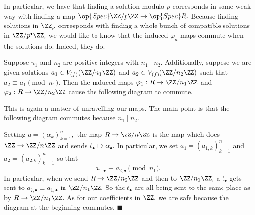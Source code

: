 In particular, we have that finding a solution modulo $p$ corresponds in some weak way with finding a map $\op{Spec}\ZZ/p\ZZ\to\op{Spec}R.$ Because finding solutions in $\ZZ_p$ corresponds with finding a whole bunch of compatible solutions in $\ZZ/p^\bullet\ZZ,$ we would like to know that the induced $\varphi_a$ maps commute when the solutions do. Indeed, they do.
\begin{lemma}
    Suppose $n_1$ and $n_2$ are positive integers with $n_1\mid n_2.$ Additionally, suppose we are given solutions $a_1\in V_{(f)}(\ZZ/n_1\ZZ)$ and $a_2\in V_{(f)}(\ZZ/n_2\ZZ)$ such that $a_2\equiv a_1\pmod{n_1}.$ Then the induced maps $\varphi_1:R\to\ZZ/n_1\ZZ$ and $\varphi_2:R\to\ZZ/n_2\ZZ$ cause the following diagram to commute.
    \begin{center}
    \end{center}
\end{lemma}
This is again a matter of unravelling our maps. The main point is that the following diagram commutes because $n_1\mid n_2.$
\begin{center}
\end{center}
Setting $a=(\alpha_k)_{k=1}^n,$ the map $R\to\ZZ/n\ZZ$ is the map which does $\ZZ\to\ZZ/n\ZZ$ and sends $t_\bullet\mapsto\alpha_\bullet.$ In particular, we set $a_1=(a_{1,k})_{k=1}^n$ and $a_2=(a_{2,k})_{k=1}^n$ so that
\[a_{1,\bullet}\equiv a_{2,\bullet}\pmod{n_1}.\]
In particular, when we send $R\to\ZZ/n_2\ZZ$ and then to $\ZZ/n_1\ZZ,$ a $t_\bullet$ gets sent to $a_{2,\bullet}\equiv a_{1,\bullet}$ in $\ZZ/n_1\ZZ.$ So the $t_\bullet$ are all being sent to the same place as by $R\to\ZZ/n_1\ZZ.$ As for our coefficients in $\ZZ,$ we are safe because the diagram at the beginning commutes. $\blacksquare$

